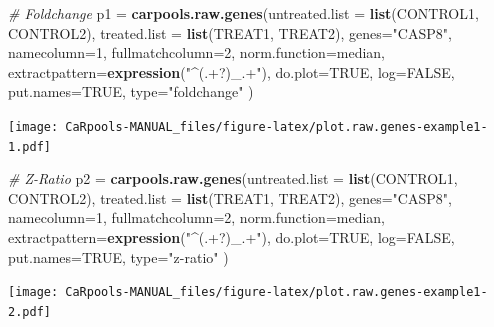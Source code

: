 \documentclass[]{article}
\newenvironment{Shaded}{\begin{snugshade}}{\end{snugshade}}
\newcommand{\KeywordTok}[1]{\textcolor[rgb]{0.13,0.29,0.53}{\textbf{{#1}}}}
\newcommand{\DataTypeTok}[1]{\textcolor[rgb]{0.13,0.29,0.53}{{#1}}}
\newcommand{\DecValTok}[1]{\textcolor[rgb]{0.00,0.00,0.81}{{#1}}}
\newcommand{\StringTok}[1]{\textcolor[rgb]{0.31,0.60,0.02}{{#1}}}
\newcommand{\CommentTok}[1]{\textcolor[rgb]{0.56,0.35,0.01}{\textit{{#1}}}}
\newcommand{\OtherTok}[1]{\textcolor[rgb]{0.56,0.35,0.01}{{#1}}}
\newcommand{\NormalTok}[1]{{#1}}
\begin{document}
\begin{Shaded}
\begin{Highlighting}[]
\CommentTok{# Foldchange}
\NormalTok{p1 =}\StringTok{ }\KeywordTok{carpools.raw.genes}\NormalTok{(}\DataTypeTok{untreated.list =} \KeywordTok{list}\NormalTok{(CONTROL1, CONTROL2),}
  \DataTypeTok{treated.list =} \KeywordTok{list}\NormalTok{(TREAT1, TREAT2), }\DataTypeTok{genes=}\StringTok{"CASP8"}\NormalTok{, }\DataTypeTok{namecolumn=}\DecValTok{1}\NormalTok{,}
  \DataTypeTok{fullmatchcolumn=}\DecValTok{2}\NormalTok{, }\DataTypeTok{norm.function=}\NormalTok{median, }\DataTypeTok{extractpattern=}\KeywordTok{expression}\NormalTok{(}\StringTok{"^(.+?)_.+"}\NormalTok{), }
  \DataTypeTok{do.plot=}\OtherTok{TRUE}\NormalTok{, }\DataTypeTok{log=}\OtherTok{FALSE}\NormalTok{, }\DataTypeTok{put.names=}\OtherTok{TRUE}\NormalTok{, }\DataTypeTok{type=}\StringTok{"foldchange"} \NormalTok{)}
\end{Highlighting}
\end{Shaded}

\texttt{[image: CaRpools-MANUAL\_files/figure-latex/plot.raw.genes-example1-1.pdf]}

\begin{Shaded}
\begin{Highlighting}[]
\CommentTok{# Z-Ratio}
\NormalTok{p2 =}\StringTok{ }\KeywordTok{carpools.raw.genes}\NormalTok{(}\DataTypeTok{untreated.list =} \KeywordTok{list}\NormalTok{(CONTROL1, CONTROL2),}
  \DataTypeTok{treated.list =} \KeywordTok{list}\NormalTok{(TREAT1, TREAT2), }\DataTypeTok{genes=}\StringTok{"CASP8"}\NormalTok{, }\DataTypeTok{namecolumn=}\DecValTok{1}\NormalTok{,}
  \DataTypeTok{fullmatchcolumn=}\DecValTok{2}\NormalTok{, }\DataTypeTok{norm.function=}\NormalTok{median, }\DataTypeTok{extractpattern=}\KeywordTok{expression}\NormalTok{(}\StringTok{"^(.+?)_.+"}\NormalTok{), }
  \DataTypeTok{do.plot=}\OtherTok{TRUE}\NormalTok{, }\DataTypeTok{log=}\OtherTok{FALSE}\NormalTok{, }\DataTypeTok{put.names=}\OtherTok{TRUE}\NormalTok{, }\DataTypeTok{type=}\StringTok{"z-ratio"} \NormalTok{)}
\end{Highlighting}
\end{Shaded}

\texttt{[image: CaRpools-MANUAL\_files/figure-latex/plot.raw.genes-example1-2.pdf]}
\end{document}
